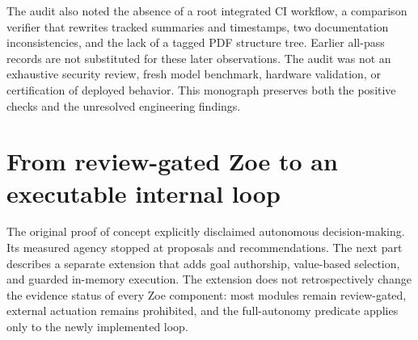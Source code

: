 The audit also noted the absence of a root integrated CI workflow, a comparison verifier that rewrites tracked summaries and timestamps, two documentation inconsistencies, and the lack of a tagged PDF structure tree. Earlier all-pass records are not substituted for these later observations. The audit was not an exhaustive security review, fresh model benchmark, hardware validation, or certification of deployed behavior. This monograph preserves both the positive checks and the unresolved engineering findings.

\section{From review-gated Zoe to an executable internal loop}
The original proof of concept explicitly disclaimed autonomous decision-making. Its measured agency stopped at proposals and recommendations. The next part describes a separate extension that adds goal authorship, value-based selection, and guarded in-memory execution. The extension does not retrospectively change the evidence status of every Zoe component: most modules remain review-gated, external actuation remains prohibited, and the full-autonomy predicate applies only to the newly implemented loop.
